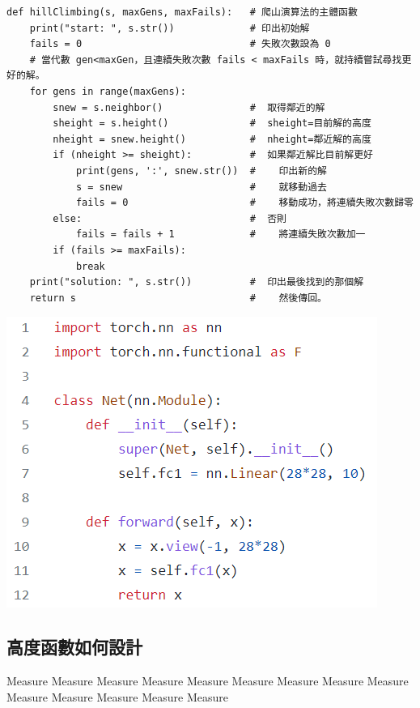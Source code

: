 \documentclass{article}
\begin{document}
\begin{lstlisting}
def hillClimbing(s, maxGens, maxFails):   # 爬山演算法的主體函數
    print("start: ", s.str())             # 印出初始解
    fails = 0                             # 失敗次數設為 0
    # 當代數 gen<maxGen，且連續失敗次數 fails < maxFails 時，就持續嘗試尋找更好的解。
    for gens in range(maxGens):
        snew = s.neighbor()               #  取得鄰近的解
        sheight = s.height()              #  sheight=目前解的高度
        nheight = snew.height()           #  nheight=鄰近解的高度
        if (nheight >= sheight):          #  如果鄰近解比目前解更好
            print(gens, ':', snew.str())  #    印出新的解
            s = snew                      #    就移動過去
            fails = 0                     #    移動成功，將連續失敗次數歸零
        else:                             #  否則
            fails = fails + 1             #    將連續失敗次數加一
        if (fails >= maxFails):
            break
    print("solution: ", s.str())          #  印出最後找到的那個解
    return s                              #    然後傳回。
\end{lstlisting}

\begin{center}
\includegraphics{./img/fc1.png}
\end{center}

\subsection{高度函數如何設計}

Measure Measure Measure Measure Measure Measure Measure Measure Measure Measure Measure Measure Measure Measure 
\end{document}
